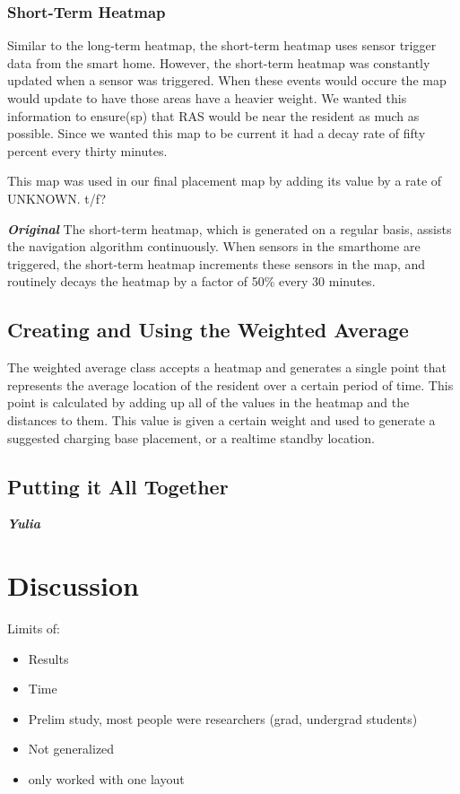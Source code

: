 \documentclass[11pt, conference, a4paper]{IEEEtran}
\begin{document}
\subsubsection{Short-Term Heatmap}
Similar to the long-term heatmap, the short-term heatmap uses sensor trigger data from the smart home. However, the short-term heatmap was constantly updated when a sensor was triggered. When these events would occure the map would update to have those areas have a heavier weight. We wanted this information to ensure(sp) that RAS would be near the resident as much as possible. Since we wanted this map to be current it had a decay rate of fifty percent every thirty minutes. 

This map was used in our final placement map by adding its value by a rate of UNKNOWN. t/f?


\textit{\textbf{Original}} The short-term heatmap, which is generated on a regular basis, assists the navigation algorithm continuously. When sensors in the smarthome are triggered, the short-term heatmap increments these sensors in the map, and routinely decays the heatmap by a factor of 50\% every 30 minutes. 


\subsection{Creating and Using the Weighted Average}
The weighted average class accepts a heatmap and generates a single point that represents the average location of the resident over a certain period of time. This point is calculated by adding up all of the values in the heatmap and the distances to them. This value is given a certain weight and used to generate a suggested charging base placement, or a realtime standby location.         

\subsection{Putting it All Together}
\textit{\textbf{Yulia}}


\section{Discussion}
Limits of:
\begin{itemize}
    \item Results
    \item Time
    \item Prelim study, most people were researchers (grad, undergrad students)
    \item Not generalized
    \item only worked with one layout
\end{itemize}
\end{document}
